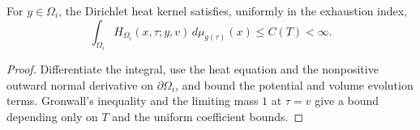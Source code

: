 \begin{lemma}
\label{lem:chow-iii-dirichlet-kernel-mass-bound}
For \(y\in\Omega_i\), the Dirichlet heat kernel satisfies, uniformly in the
exhaustion index,
\[
 \int_{\Omega_i}H_{\Omega_i}(x,\tau;y,v)
 \,d\mu_{g(\tau)}(x)\le C(T)<\infty.
\]
\end{lemma}
\begin{proof}
Differentiate the integral, use the heat equation and the nonpositive outward
normal derivative on \(\partial\Omega_i\), and bound the potential and volume
evolution terms.  Gronwall's inequality and the limiting mass \(1\) at
\(\tau=v\) give a bound depending only on \(T\) and the uniform coefficient
bounds.
\end{proof}
